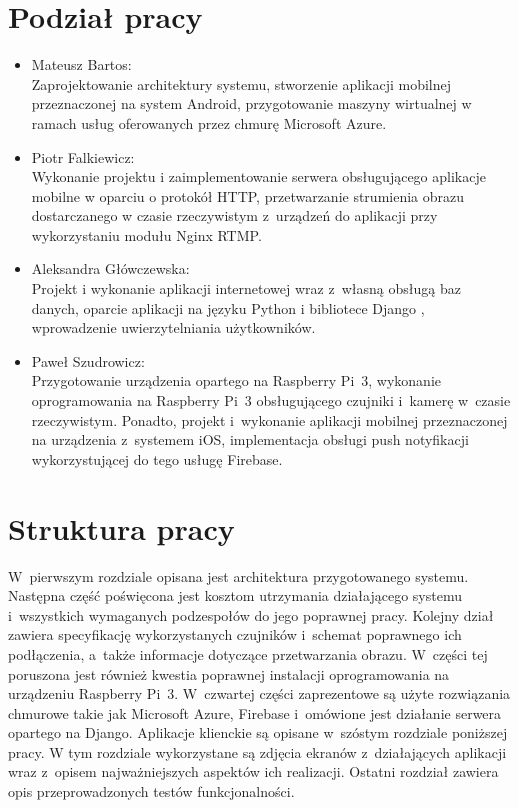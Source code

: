 \section{Podział pracy}
\begin{itemize}
\item Mateusz Bartos: \\
Zaprojektowanie architektury systemu, stworzenie aplikacji mobilnej przeznaczonej na system Android, przygotowanie maszyny wirtualnej w ramach usług oferowanych przez chmurę Microsoft Azure.
\item Piotr Falkiewicz: \\
Wykonanie projektu i zaimplementowanie serwera obsługującego aplikacje mobilne w oparciu o protokół HTTP, przetwarzanie strumienia obrazu dostarczanego w czasie rzeczywistym z~urządzeń do aplikacji przy wykorzystaniu modułu Nginx RTMP.
\item Aleksandra Główczewska: \\
Projekt i wykonanie aplikacji internetowej wraz z~własną obsługą baz danych, oparcie aplikacji na języku Python i bibliotece Django \cite{djangoREST}, wprowadzenie uwierzytelniania użytkowników.
\item Paweł Szudrowicz: \\
Przygotowanie urządzenia opartego na Raspberry Pi~3, wykonanie oprogramowania na Raspberry Pi~3 obsługującego czujniki i~kamerę w~czasie rzeczywistym. Ponadto, projekt i~wykonanie aplikacji mobilnej przeznaczonej na urządzenia z~systemem iOS, implementacja obsługi push notyfikacji wykorzystującej do tego usługę Firebase.
\end{itemize}

\section{Struktura pracy}
W~pierwszym rozdziale opisana jest architektura przygotowanego systemu. Następna część poświęcona jest kosztom utrzymania działającego systemu i~wszystkich wymaganych podzespołów do jego poprawnej pracy. Kolejny dział zawiera specyfikację wykorzystanych czujników i~schemat poprawnego ich podłączenia, a~także informacje dotyczące przetwarzania obrazu. W~części tej poruszona jest również kwestia poprawnej instalacji oprogramowania na urządzeniu Raspberry Pi~3.  W~czwartej części zaprezentowe są użyte rozwiązania chmurowe takie jak Microsoft Azure, Firebase i~omówione jest działanie serwera opartego na Django. Aplikacje klienckie są opisane w~szóstym rozdziale poniższej pracy. W tym rozdziale wykorzystane są zdjęcia ekranów z~działających aplikacji wraz z~opisem najważniejszych aspektów ich realizacji. Ostatni rozdział zawiera opis przeprowadzonych testów funkcjonalności.

